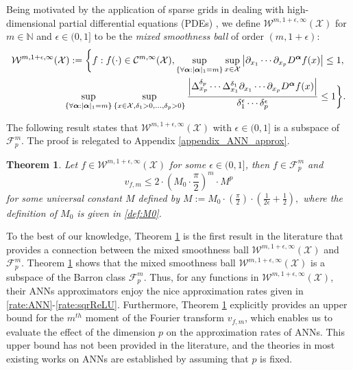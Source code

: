 \documentclass[11pt]{article}
\newtheorem{thm}{Theorem}
\numberwithin{equation}{section}
\begin{document}
Being motivated by the application of sparse grids in dealing with high-dimensional partial differential equations (PDEs) \citep{bungartz2004sparse}, we define $\mathcal{W}^{m,1+\epsilon,\infty }(\mathcal{X})$ for $m\in\mathbb{N}$ and $\epsilon\in (0,1]$ to be the \emph{mixed smoothness ball} of order $(m,1+\epsilon)$:
\begin{align}\label{def:mix}
\mathcal{W}^{m,1+\epsilon,\infty}&(\mathcal{X}):=\bigg\{f:f(\cdot)\in\mathcal{C}^{m,\infty}(\mathcal{X}),\sup_{\{\forall \boldsymbol{\alpha}: |\boldsymbol{\alpha}|_{1}= m\}}\sup_{x\in \mathcal{X}}\left|\partial_{x_1}\cdots \partial_{x_p}D^{\boldsymbol{\alpha}}f(x)\right|\leq 1, \notag \\
& \quad  \sup_{\{\forall \boldsymbol{\alpha}: |\boldsymbol{\alpha}|_{1}= m\}}\sup_{\{x\in \mathcal{X},\delta_1>0,...,\delta_p>0\}}\frac{\left|\Delta^{\delta_p}_{x_p}\cdots\Delta^{\delta_1}_{x_1}\partial_{x_1}\cdots \partial_{x_p}D^{\boldsymbol{\alpha}}f(x)\right|}{\delta_1^{\epsilon}\cdots \delta_p^{\epsilon}}\leq 1\bigg\}.
\end{align}


  The following result states that $\mathcal{W}^{m,1+\epsilon,\infty}(\mathcal{X})$ with $\epsilon\in (0,1]$  is a subspace of $\mathcal{F}_p^m$. The proof is relegated to Appendix \ref{appendix_ANN_approx}.
\begin{thm}\label{thm:vfm_finite}
	Let $f\in \mathcal{W}^{m,1+\epsilon,\infty}(\mathcal{X})$ for some $\epsilon\in (0,1]$, then  $f\in\mathcal{F}_p^m$ and $$v_{f,m}\leq 2\cdot \left(M_0\cdot \frac{\pi}{2}\right)^m \cdot M^{p}$$ for some universal constant $M$ defined by
	$M:=M_0\cdot \left(\frac{\pi}{2}\right)\cdot \left(\frac{1}{2\epsilon}+\frac{1}{2}\right) ,$
	where the definition of $M_0$ is given in \eqref{def:M0}.
\end{thm}
To the best of our knowledge, Theorem \ref{thm:vfm_finite} is the first result in the literature that provides a connection between the mixed smoothness ball $\mathcal{W}^{m,1+\epsilon,\infty }(\mathcal{X})$ and $\mathcal{F}_p^m$. Theorem \ref{thm:vfm_finite} shows that the mixed smoothness ball $\mathcal{W}^{m,1+\epsilon,\infty }(\mathcal{X})$ is a subspace of the Barron class $\mathcal{F}_p^m$. Thus, for any functions in $\mathcal{W}^{m,1+\epsilon,\infty }(\mathcal{X})$, their ANNs approximators enjoy the nice approximation rates given in \eqref{rate:ANN}-\eqref{rate:sqrReLU}.  Furthermore, Theorem \ref{thm:vfm_finite} explicitly provides an upper bound for the $m^{th}$ moment of the Fourier transform $v_{f,m}$, which enables us to evaluate the effect of the dimension $p$ on the approximation rates of
ANNs. This upper bound has not been provided in the literature, and the theories  in most existing works on ANNs are established by assuming that $p$ is fixed.
\end{document}
